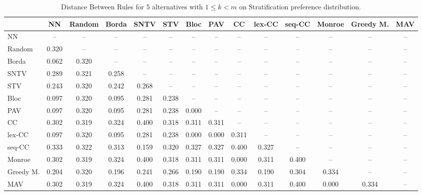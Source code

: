 
\begin{table*}
\centering
\begin{tabular}{lccccccccccccc}
\toprule
 & NN & Random & Borda & SNTV & STV & Bloc & PAV & CC & lex-CC & seq-CC & Monroe & Greedy M. & MAV \\
\midrule
NN & -- & -- & -- & -- & -- & -- & -- & -- & -- & -- & -- & -- & -- \\
Random & 0.320 & -- & -- & -- & -- & -- & -- & -- & -- & -- & -- & -- & -- \\
Borda & 0.062 & 0.320 & -- & -- & -- & -- & -- & -- & -- & -- & -- & -- & -- \\
SNTV & 0.289 & 0.321 & 0.258 & -- & -- & -- & -- & -- & -- & -- & -- & -- & -- \\
STV & 0.243 & 0.320 & 0.242 & 0.268 & -- & -- & -- & -- & -- & -- & -- & -- & -- \\
Bloc & 0.097 & 0.320 & 0.095 & 0.281 & 0.238 & -- & -- & -- & -- & -- & -- & -- & -- \\
PAV & 0.097 & 0.320 & 0.095 & 0.281 & 0.238 & 0.000 & -- & -- & -- & -- & -- & -- & -- \\
CC & 0.302 & 0.319 & 0.324 & 0.400 & 0.318 & 0.311 & 0.311 & -- & -- & -- & -- & -- & -- \\
lex-CC & 0.097 & 0.320 & 0.095 & 0.281 & 0.238 & 0.000 & 0.000 & 0.311 & -- & -- & -- & -- & -- \\
seq-CC & 0.333 & 0.322 & 0.313 & 0.159 & 0.320 & 0.327 & 0.327 & 0.400 & 0.327 & -- & -- & -- & -- \\
Monroe & 0.302 & 0.319 & 0.324 & 0.400 & 0.318 & 0.311 & 0.311 & 0.000 & 0.311 & 0.400 & -- & -- & -- \\
Greedy M. & 0.204 & 0.320 & 0.196 & 0.241 & 0.266 & 0.190 & 0.190 & 0.334 & 0.190 & 0.304 & 0.334 & -- & -- \\
MAV & 0.302 & 0.319 & 0.324 & 0.400 & 0.318 & 0.311 & 0.311 & 0.000 & 0.311 & 0.400 & 0.000 & 0.334 & -- \\
\bottomrule
\end{tabular}

\caption{Distance Between Rules for 5 alternatives with $1 \leq k < m$ on Stratification preference distribution.}
\end{table*}
